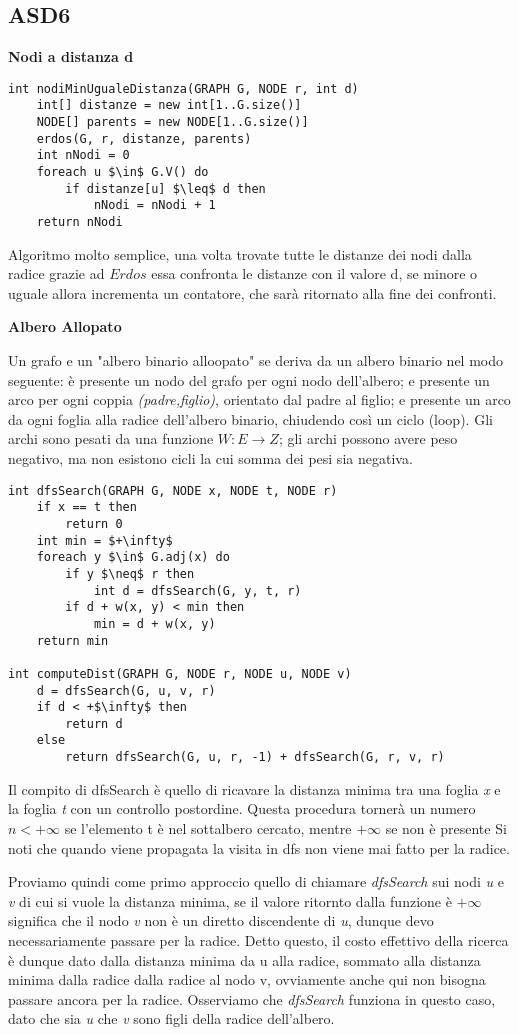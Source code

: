 \documentclass[../cheatSheetAlgoritmi.tex]{subfiles}
\begin{document}
\subsection{ASD6}
\textbf{Nodi a distanza d}
\begin{lstlisting}[caption= Nodi che distano un numero di archi $\leq$ d]
int nodiMinUgualeDistanza(GRAPH G, NODE r, int d)
	int[] distanze = new int[1..G.size()]
  	NODE[] parents = new NODE[1..G.size()]
  	erdos(G, r, distanze, parents)
  	int nNodi = 0
  	foreach u $\in$ G.V() do
    	if distanze[u] $\leq$ d then 
      		nNodi = nNodi + 1 
  	return nNodi
\end{lstlisting}
Algoritmo molto semplice, una volta trovate tutte le distanze dei nodi dalla radice grazie ad $Erdos$ essa confronta le distanze con il valore d, se minore o uguale allora incrementa un contatore, che sarà ritornato alla fine dei confronti.

\bigskip

\textbf{Albero Allopato}

Un grafo e un "albero binario alloopato" se
deriva da un albero binario nel modo seguente: è presente un nodo del
grafo per ogni nodo dell’albero; e presente un arco per ogni coppia
\textit{(padre,figlio)}, orientato dal padre al figlio; e presente un arco da ogni
foglia alla radice dell’albero binario, chiudendo così un ciclo (loop). Gli
archi sono pesati da una funzione $W : E\rightarrow Z$; gli archi possono avere
peso negativo, ma non esistono cicli la cui somma dei pesi sia negativa.
\begin{lstlisting}[caption= Albero Binario Allopato]
int dfsSearch(GRAPH G, NODE x, NODE t, NODE r)
	if x == t then
    	return 0
  	int min = $+\infty$ 
  	foreach y $\in$ G.adj(x) do
    	if y $\neq$ r then
      		int d = dfsSearch(G, y, t, r)
      	if d + w(x, y) < min then
        	min = d + w(x, y)
  	return min
 
int computeDist(GRAPH G, NODE r, NODE u, NODE v)
	d = dfsSearch(G, u, v, r)
  	if d < +$\infty$ then
    	return d
  	else
  		return dfsSearch(G, u, r, -1) + dfsSearch(G, r, v, r)
\end{lstlisting}
Il compito di dfsSearch è quello di ricavare la distanza minima tra una foglia \textit{x} e la foglia \textit{t} con un controllo postordine.
Questa procedura tornerà un numero $n < +\infty$ se l'elemento t è nel sottalbero cercato, mentre $+\infty$ se non è presente
Si noti che quando viene propagata la visita in dfs non viene mai fatto per la radice. 

Proviamo quindi come primo approccio quello di chiamare \textit{dfsSearch} sui nodi \textit{u} e \textit{v} di cui si vuole la distanza minima, se il valore ritornto dalla funzione è $+\infty$ significa che il nodo \textit{v} non è un diretto discendente di \textit{u}, dunque devo necessariamente passare per la radice.
Detto questo, il costo effettivo della ricerca è dunque dato dalla distanza minima da u alla radice, sommato alla distanza minima dalla radice dalla radice al nodo v, ovviamente anche qui non bisogna passare ancora per la radice. Osserviamo che \textit{dfsSearch} funziona in questo caso, dato che sia \textit{u} che \textit{v} sono figli della radice dell'albero.
\end{document}
